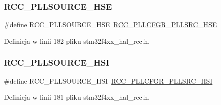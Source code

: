 \subsubsection{\texorpdfstring{R\+C\+C\+\_\+\+P\+L\+L\+S\+O\+U\+R\+C\+E\+\_\+\+H\+SE}{RCC\_PLLSOURCE\_HSE}}
{\footnotesize\ttfamily \#define R\+C\+C\+\_\+\+P\+L\+L\+S\+O\+U\+R\+C\+E\+\_\+\+H\+SE~\hyperlink{group___peripheral___registers___bits___definition_gae3a86c3918526efe2258ecbb34b91587}{R\+C\+C\+\_\+\+P\+L\+L\+C\+F\+G\+R\+\_\+\+P\+L\+L\+S\+R\+C\+\_\+\+H\+SE}}



Definicja w linii 182 pliku stm32f4xx\+\_\+hal\+\_\+rcc.\+h.

\mbox{\label{group___r_c_c___p_l_l___clock___source_ga0e07703f1ccb3d60f8a47a2dc631c218}} 
\subsubsection{\texorpdfstring{R\+C\+C\+\_\+\+P\+L\+L\+S\+O\+U\+R\+C\+E\+\_\+\+H\+SI}{RCC\_PLLSOURCE\_HSI}}
{\footnotesize\ttfamily \#define R\+C\+C\+\_\+\+P\+L\+L\+S\+O\+U\+R\+C\+E\+\_\+\+H\+SI~\hyperlink{group___peripheral___registers___bits___definition_gadf688c4f038f29247cc0280dbdda24a7}{R\+C\+C\+\_\+\+P\+L\+L\+C\+F\+G\+R\+\_\+\+P\+L\+L\+S\+R\+C\+\_\+\+H\+SI}}



Definicja w linii 181 pliku stm32f4xx\+\_\+hal\+\_\+rcc.\+h.

